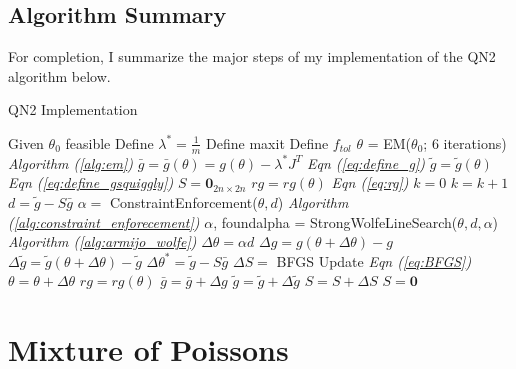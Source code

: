 \documentclass[letter,12pt]{article}
\begin{document}
\subsection{Algorithm Summary}

For completion, I summarize the major steps of my implementation of the QN2 algorithm below.

\begin{algorithm} 
\caption{QN2 Implementation}
\label{alg:qn2}
\begin{algorithmic}[1]
\State Given $\theta_0$ feasible
\State Define $\lambda^* = \frac{1}{m}$
\State Define maxit
\State Define $f_{tol}$
\State $\theta$ = EM($\theta_0$; $6$ iterations)
\indent \indent  \indent\indent \indent \indent \indent \indent  \textit{Algorithm (\ref{alg:em})}
\State $\bar{g} = \bar{g}(\theta) = g(\theta) - \lambda^*J^T$
\indent  \indent \indent\indent \indent \indent \indent \indent \space  \textit{Eqn (\ref{eq:define_g})}
\State $\tilde{g} = \tilde{g}(\theta)$
\indent \indent \indent \indent \indent \indent\indent \indent \indent \indent \indent \space \space \space \textit{Eqn (\ref{eq:define_gsquiggly})}
\State $S = \boldsymbol{0}_{2n \times 2n}$
\State $rg = rg(\theta)$
\indent \indent \indent \indent \indent \indent\indent \indent \indent \indent \indent  \textit{Eqn (\ref{eq:rg})}
\State $k = 0$
\State $k = k + 1$
\State $d = \tilde{g} - S\bar{g}$
\State $\alpha = $ ConstraintEnforcement($\theta,d$) 
\indent \indent \indent \indent \indent \space \space \textit{Algorithm (\ref{alg:constraint_enforecement})}
\State $\alpha$, foundalpha = StrongWolfeLineSearch($\theta,d,\alpha$) 
\indent \indent \textit{Algorithm (\ref{alg:armijo_wolfe})}
\State $\Delta\theta = \alpha d$
\State $\Delta g = g(\theta+\Delta\theta) - g$
\State $\Delta \tilde{g} = \tilde{g}(\theta + \Delta\theta) - \tilde{g}$
\State $\Delta \theta^* = \tilde{g} - S\bar{g}$
\State $\Delta S = $ BFGS Update 
\indent \indent \indent \indent \indent \indent \indent \space \space \textit{Eqn (\ref{eq:BFGS})}
\State $\theta = \theta + \Delta\theta$
\State $rg = rg(\theta)$
\State $\bar{g} = \bar{g}+\Delta g$
\State $\tilde{g} = \tilde{g}+\Delta \tilde{g}$
\State $S = S +\Delta S$
\Else
\State $S = \boldsymbol{0}$
\EndIf
\EndWhile
\end{algorithmic}
\end{algorithm}


\section{Mixture of Poissons} \label{section:poisson}
\end{document}
